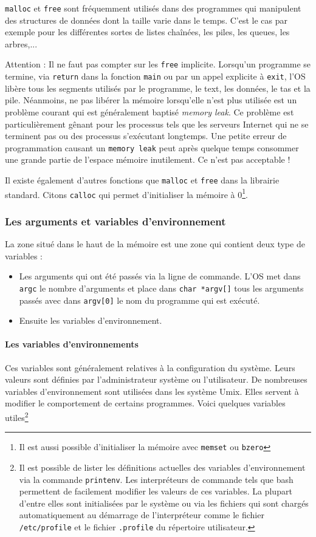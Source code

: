 \texttt{malloc} et \texttt{free} sont fréquemment utilisés dans des programmes qui manipulent des structures de données dont la taille varie dans le temps.
C'est le cas par exemple pour les différentes sortes de listes chaînées, les piles, les queues, les arbres,...

Attention : Il ne faut pas compter sur les \texttt{free} implicite.
Lorsqu'un programme se termine, via \texttt{return} dans la fonction \texttt{main} ou par un appel explicite à \texttt{exit}, l'OS libère tous les segments utilisés par le programme, le text, les données, le tas et la pile.
Néanmoins, ne pas libérer la mémoire lorsqu'elle n'est plus utilisée est un problème courant qui est généralement baptisé \textit{memory leak}.
Ce problème est particulièrement gênant pour les processus tels que les serveurs Internet qui ne se terminent pas ou des processus s'exécutant longtemps.
Une petite erreur de programmation causant un \texttt{memory leak} peut après quelque temps consommer une grande partie de l'espace mémoire inutilement.
Ce n'est pas acceptable !

Il existe également d'autres fonctions que \texttt{malloc} et \texttt{free} dans la librairie standard.
Citons \texttt{calloc} qui permet d'initialiser la mémoire à 0\footnote{Il est aussi possible d'initialiser la mémoire avec \texttt{memset} ou \texttt{bzero}}.

\subsubsection{Les arguments et variables d'environnement}
La zone situé dans le haut de la mémoire est une zone qui contient deux type de variables :
\begin{itemize}
  \item Les arguments qui ont été passés via la ligne de commande.
    L'OS met dans \texttt{argc} le nombre d'arguments et place dans \texttt{char *argv[]} tous les arguments passés avec dans \texttt{argv[0]} le nom du programme qui est exécuté.
  \item Ensuite les variables d'environnement.
\end{itemize}

\paragraph{Les variables d'environnements}
Ces variables sont généralement relatives à la configuration du système.
Leurs valeurs sont définies par l'administrateur système ou l'utilisateur.
De nombreuses variables d'environnement sont utilisées dans les système Umix.
Elles servent à modifier le comportement de certains programmes.
Voici quelques variables utiles\footnote{Il est possible de lister les définitions actuelles des variables d'environnement via la commande \texttt{printenv}.
  Les interpréteurs de commande tels que bash permettent de facilement modifier les valeurs de ces variables.
La plupart d'entre elles sont initialisées par le système ou via les fichiers qui sont chargés automatiquement au démarrage de l'interpréteur comme le fichier \texttt{/etc/profile} et le fichier \texttt{.profile} du répertoire utilisateur.}

